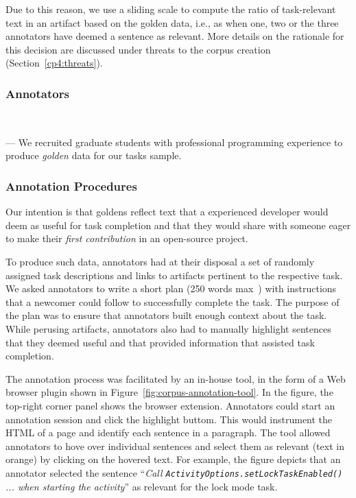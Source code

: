 Due to this reason, we use a sliding scale to compute the ratio of task-relevant text in an artifact based on the golden data, i.e., 
as when one, two or the three annotators have deemed a sentence as relevant. More details on the rationale for this decision are discussed under threats to the corpus creation (Section~\ref{cp4:threats}).




\subsubsection{Annotators}
\textcolor{white}{force ident} %

--- We recruited  graduate students with professional programming experience to produce \textit{golden} data for our tasks sample. \vspace{3mm}


\subsubsection{Annotation Procedures}

Our intention is that goldens reflect text that a experienced developer would deem as useful for task completion and that they would share with someone eager to make their \textit{first contribution} in an open-source project.


To produce such data, annotators had  at their disposal a set of randomly assigned task descriptions and links to artifacts pertinent to the respective task. We asked annotators to write a short plan (250 words max~\cite{Rastkar2010}) with instructions that a newcomer could follow to successfully complete the task. 
The purpose of the plan was to ensure that annotators built enough context about the task.
While perusing artifacts, annotators also had to manually highlight sentences that they deemed useful and that provided information that assisted task completion. 


The annotation process was facilitated by an in-house tool, in the form of a Web browser plugin shown in Figure~\ref{fig:corpus-annotation-tool}. In the figure, the top-right corner panel shows the browser extension. Annotators could start an annotation session and click the highlight buttom.
This would instrument the HTML of a page and identify each sentence in a paragraph. The tool allowed annotators to hove over individual sentences and select them as relevant (text in orange) by clicking on the hovered text. For example, the figure depicts that an annotator selected  the sentence
``\textit{Call {\small \texttt{ActivityOptions.setLockTaskEnabled()}} ... when starting the activity}'' as relevant for the lock mode task.


